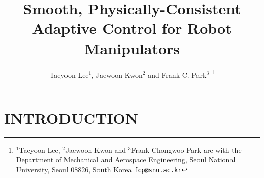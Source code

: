 \documentclass[letterpaper, 10 pt, conference]{ieeeconf}  %
\title{\LARGE \bf
Smooth, Physically-Consistent Adaptive Control for Robot Manipulators
}
\author{Taeyoon Lee$^{1}$, Jaewoon Kwon$^{2}$ and Frank C. Park$^{3}$%
\thanks{$^{1}$Taeyoon Lee, $^{2}$Jaewoon Kwon and $^{3}$Frank Chongwoo Park  are with the Department of
Mechanical and Aerospace Engineering, Seoul National University, Seoul
08826, South Korea 
        {\tt\small fcp@snu.ac.kr}}%
}
\begin{document}
\maketitle
\thispagestyle{empty}
\pagestyle{empty}


\begin{abstract}
\newline
\newline
\newline
\newline
\newline
\newline
\newline
\newline
\newline
\newline
\newline
\newline
\newline
\newline
\newline
\newline
\end{abstract}


\section{INTRODUCTION}
\end{document}
